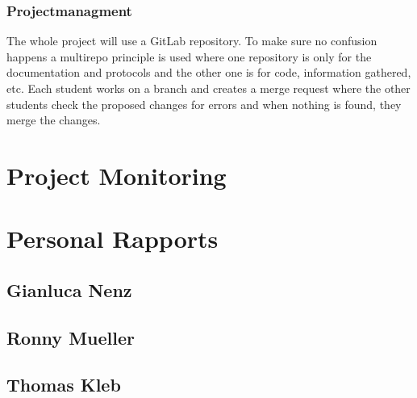 \subsubsection*{Projectmanagment}
The whole project will use a GitLab repository. To make sure no confusion happens a multirepo principle is used where one repository is only for the documentation and protocols and the other one is for code, information gathered, etc. Each student works on a branch and creates a merge request where the other students check the proposed changes for errors and when nothing is found, they merge the changes. 



\newpage
\section{Project Monitoring}


\newpage
\section{Personal Rapports}

\subsection{Gianluca Nenz}


\subsection{Ronny Mueller}


\newpage
\subsection{Thomas Kleb}

